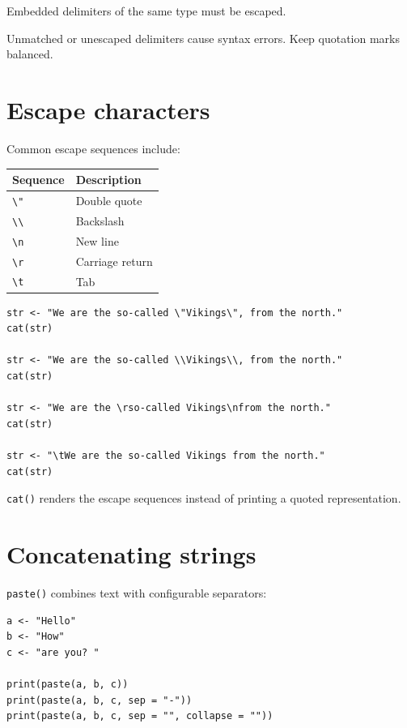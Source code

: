 Embedded delimiters of the same type must be escaped.

\begin{pitfall}
Unmatched or unescaped delimiters cause syntax errors. Keep quotation marks balanced.
\end{pitfall}

\section{Escape characters}

Common escape sequences include:

\begin{dstable}
\begin{tabularx}{\linewidth}{@{}p{2.4cm}X@{}}
\toprule
\rowcolor{DSPaleBlue!92}
Sequence & Description \\
\midrule
\texttt{\textbackslash"} & Double quote \\
\texttt{\textbackslash\textbackslash} & Backslash \\
\texttt{\textbackslash n} & New line \\
\texttt{\textbackslash r} & Carriage return \\
\texttt{\textbackslash t} & Tab \\
\bottomrule
\end{tabularx}
\end{dstable}

\begin{lstlisting}[style=dsr]
str <- "We are the so-called \"Vikings\", from the north."
cat(str)

str <- "We are the so-called \\Vikings\\, from the north."
cat(str)

str <- "We are the \rso-called Vikings\nfrom the north."
cat(str)

str <- "\tWe are the so-called Vikings from the north."
cat(str)
\end{lstlisting}

\texttt{cat()} renders the escape sequences instead of printing a quoted representation.

\section{Concatenating strings}

\texttt{paste()} combines text with configurable separators:

\begin{lstlisting}[style=dsr]
a <- "Hello"
b <- "How"
c <- "are you? "

print(paste(a, b, c))
print(paste(a, b, c, sep = "-"))
print(paste(a, b, c, sep = "", collapse = ""))
\end{lstlisting}

